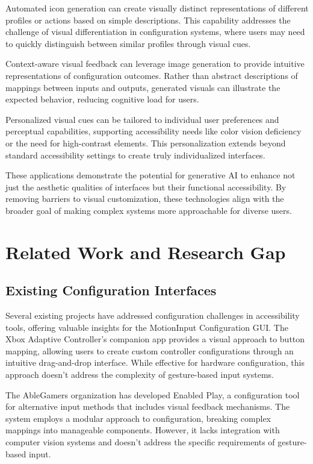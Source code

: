Automated icon generation can create visually distinct representations of different profiles or actions based on simple descriptions. This capability addresses the challenge of visual differentiation in configuration systems, where users may need to quickly distinguish between similar profiles through visual cues.

Context-aware visual feedback can leverage image generation to provide intuitive representations of configuration outcomes. Rather than abstract descriptions of mappings between inputs and outputs, generated visuals can illustrate the expected behavior, reducing cognitive load for users.

Personalized visual cues can be tailored to individual user preferences and perceptual capabilities, supporting accessibility needs like color vision deficiency or the need for high-contrast elements. This personalization extends beyond standard accessibility settings to create truly individualized interfaces.

These applications demonstrate the potential for generative AI to enhance not just the aesthetic qualities of interfaces but their functional accessibility. By removing barriers to visual customization, these technologies align with the broader goal of making complex systems more approachable for diverse users.

\section{Related Work and Research Gap}
\subsection{Existing Configuration Interfaces}
Several existing projects have addressed configuration challenges in accessibility tools, offering valuable insights for the MotionInput Configuration GUI. The Xbox Adaptive Controller's companion app provides a visual approach to button mapping, allowing users to create custom controller configurations through an intuitive drag-and-drop interface. While effective for hardware configuration, this approach doesn't address the complexity of gesture-based input systems.

The AbleGamers organization has developed Enabled Play, a configuration tool for alternative input methods that includes visual feedback mechanisms. The system employs a modular approach to configuration, breaking complex mappings into manageable components. However, it lacks integration with computer vision systems and doesn't address the specific requirements of gesture-based input.

